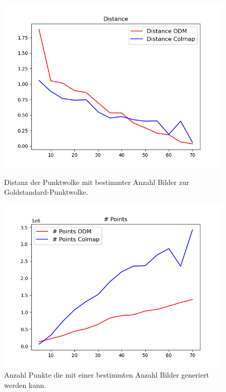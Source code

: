 \documentclass[12pt,titlepage, twoside]{article}
\begin{document}
\begin{figure}
    \centering
    \begin{minipage}{0.475\textwidth}
        \centering
        \includegraphics[width=1.0\textwidth]{./Images/DistanceCloudGen.png}
        \caption{Distanz der Punktwolke mit bestimmter Anzahl Bilder zur Goldstandard-Punktwolke.}
        \label{fig:DistanceCloudGen}
    \end{minipage}\hfill
    \begin{minipage}{0.475\textwidth}
        \centering
        \includegraphics[width=1.0\textwidth]{./Images/NPointsCloudGen.png}
        \caption{Anzahl Punkte die mit einer bestimmten Anzahl Bilder generiert werden kann.}
        \label{fig:NPointsCloudGen}
    \end{minipage}
\end{figure}
\end{document}
